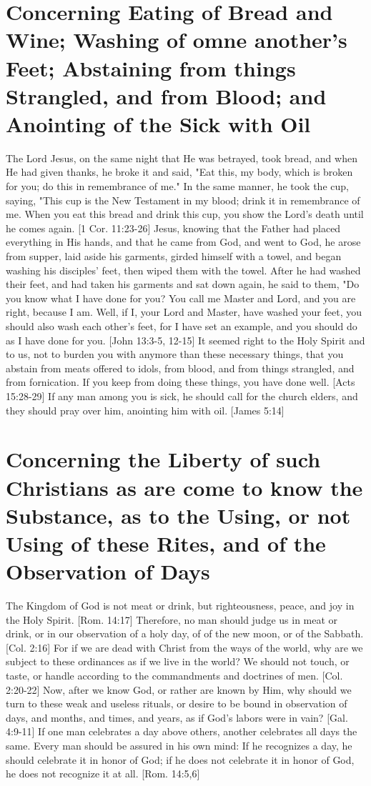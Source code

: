 \documentclass[../main.tex]{subfiles}
\begin{document}
	\section{Concerning Eating of Bread and Wine; Washing of omne another's Feet; Abstaining from things Strangled, and from Blood; and Anointing of the Sick with Oil}

	The Lord Jesus, on the same night that He was betrayed, took bread, and when He had given thanks, he broke it and said, "Eat this, my body, which is broken for you; do this in remembrance of me." In the same manner, he took the cup, saying, "This cup is the New Testament in my blood; drink it in remembrance of me. When you eat this bread and drink this cup, you show the Lord's death until he comes again. [1 Cor. 11:23-26] Jesus, knowing that the Father had placed everything in His hands, and that he came from God, and went to God, he arose from supper, laid aside his garments, girded himself with a towel, and began washing his disciples' feet, then wiped them with the towel. After he had washed their feet, and had taken his garments and sat down again, he said to them, "Do you know what I have done for you?  You call me Master and Lord, and you are right, because I am. Well, if I, your Lord and Master, have washed your feet, you should also wash each other's feet, for I have set an example, and you should do as I have done for you. [John 13:3-5, 12-15] It seemed right to the Holy Spirit and to us, not to burden you with anymore than these necessary things, that you abstain from meats offered to idols, from blood, and from things strangled, and from fornication. If you keep from doing these things, you have done well. [Acts 15:28-29] If any man among you is sick, he should call for the church elders, and they should pray over him, anointing him with oil. [James 5:14]

	\section{Concerning the Liberty of such Christians as are come to know the Substance, as to the Using, or not Using of these Rites, and of the Observation of Days}

	The Kingdom of God is not meat or drink, but righteousness, peace, and joy in the Holy Spirit. [Rom. 14:17] Therefore, no man should judge us in meat or drink, or in our observation of a holy day, of of the new moon, or of the Sabbath. [Col. 2:16] For if we are dead with Christ from the ways of the world, why are we subject to these ordinances as if we live in the world? We should not touch, or taste, or handle according to the commandments and doctrines of men. [Col. 2:20-22] Now, after we know God, or rather are known by Him, why should we turn to these weak and useless rituals, or desire to be bound in observation of days, and months, and times, and years, as if God's labors were in vain? [Gal. 4:9-11] If one man celebrates a day above others, another celebrates all days the same. Every man should be assured in his own mind: If he recognizes a day, he should celebrate it in honor of God; if he does not celebrate it in honor of God, he does not recognize it at all. [Rom. 14:5,6]
\end{document}
